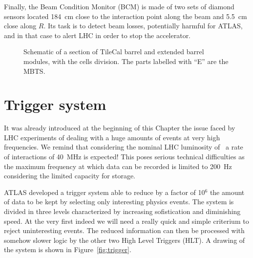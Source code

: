 Finally, the Beam Condition Monitor (BCM) is made of two sets of diamond sensors located 184~cm close
to the interaction point along the beam and 5.5~cm close along $R$. Its task is to detect beam losses,
potentially harmful for ATLAS, and in that case to alert LHC in order to stop the accelerator.



\begin{figure}[tb]\begin{center}
	\caption{Schematic of a section of TileCal barrel and extended barrel modules, with the
        cells division. The parts labelled with ``E'' are the MBTS.\label{fig:extendedbarrel}}
\end{center}\end{figure}


\section{Trigger system}\label{sec:trigger}

It was already introduced at the beginning of this Chapter the issue
faced by LHC experiments of dealing with a huge amounts of events
at very high frequencies. We remind that considering the nominal LHC
luminosity of \highL\ a rate of interactions of 40~MHz is expected!
This poses serious technical difficulties as the maximum frequency
at which data can be recorded is limited to 200~Hz considering the
limited capacity for storage.

ATLAS developed a trigger system able to reduce by a factor of 10$^6$
the amount of data to be kept by selecting only interesting physics events.
The system is divided in three levels characterized by increasing sofistication
and diminishing speed. At the very first indeed we will need a really quick and
simple criterium to reject uninteresting events. The reduced information can then be
processed with somehow slower logic by the other two High Level Triggers (HLT).
A drawing of the system is shown in Figure~\ref{fig:trigger}.

